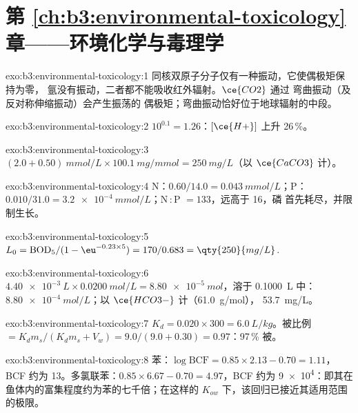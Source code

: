 \section*{第 \ref{ch:b3:environmental-toxicology} 章——环境化学与毒理学}

\begin{solution}{exo:b3:environmental-toxicology:1}
同核双原子分子仅有一种振动，它使偶极矩保持为零，
氩没有振动，二者都不能吸收红外辐射。$\ce{CO2}$ 通过
弯曲振动（及反对称伸缩振动）会产生振荡的
偶极矩；弯曲振动恰好位于地球辐射的中段。
\end{solution}

\begin{solution}{exo:b3:environmental-toxicology:2}
$10^{0.1} = 1.26$：$[\ce{H+}]$ 上升 26\,\%。
\end{solution}

\begin{solution}{exo:b3:environmental-toxicology:3}
$(2.0 + 0.50)\ \unit{mmol/L} \times \qty{100.1}{mg/mmol} = \qty{250}{mg/L}$（以 $\ce{CaCO3}$ 计）。
\end{solution}

\begin{solution}{exo:b3:environmental-toxicology:4}
N：$0.60/14.0 = \qty{0.043}{mmol/L}$；P：$0.010/31.0 = \qty{3.2e-4}{mmol/L}$；N\,:\,P $= 133$，远高于 16，磷
首先耗尽，并限制生长。
\end{solution}

\begin{solution}{exo:b3:environmental-toxicology:5}
$L_0 = \mathrm{BOD_5}/(1 - \eu^{-0.23 \times 5}) = 170/0.683 = \qty{250}{mg/L}$.
\end{solution}

\begin{solution}{exo:b3:environmental-toxicology:6}
$\qty{4.40e-3}{L} \times \qty{0.0200}{mol/L} = \qty{8.80e-5}{mol}$，溶于 \qty{0.1000}{L} 中： $\qty{8.80e-4}{mol/L}$；以 $\ce{HCO3-}$ 计（\qty{61.0}{g/mol}），
\qty{53.7}{mg/L}。
\end{solution}

\begin{solution}{exo:b3:environmental-toxicology:7}
$K_d = 0.020 \times 300 = \qty{6.0}{L/kg}$。被比例 $= K_dm_s/(K_dm_s + V_w) = 9.0/(9.0 + 0.30) = 0.97$：97\,\% 被。
\end{solution}

\begin{solution}{exo:b3:environmental-toxicology:8}
苯：$\log\mathrm{BCF} = 0.85 \times 2.13 - 0.70 = 1.11$，BCF 约为 13。多氯联苯：$0.85 \times 6.67 - 0.70 = 4.97$，BCF 约为
\num{9e4}：即其在鱼体内的富集程度约为苯的七千倍；在这样的
$K_{ow}$ 下，该回归已接近其适用范围的极限。
\end{solution}


